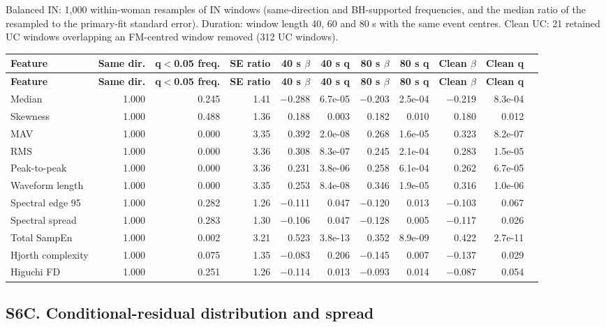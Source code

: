 \documentclass[10pt]{article}
\begin{document}
Balanced IN: 1,000 within-woman resamples of IN windows (same-direction and BH-supported frequencies, and the median ratio of the resampled to the primary-fit standard error). Duration: window length 40, 60 and 80 s with the same event centres. Clean UC: 21 retained UC windows overlapping an FM-centred window removed (312 UC windows).
\begin{longtable}{p{3.0cm}rrrrrrrrrr}
\toprule
\textbf{Feature} & \textbf{Same dir.} & \textbf{q$<$0.05 freq.} & \textbf{SE ratio} & \textbf{40 s $\beta$} & \textbf{40 s q} & \textbf{80 s $\beta$} & \textbf{80 s q} & \textbf{Clean $\beta$} & \textbf{Clean q} \\
\midrule
\endfirsthead
\toprule
\textbf{Feature} & \textbf{Same dir.} & \textbf{q$<$0.05 freq.} & \textbf{SE ratio} & \textbf{40 s $\beta$} & \textbf{40 s q} & \textbf{80 s $\beta$} & \textbf{80 s q} & \textbf{Clean $\beta$} & \textbf{Clean q} \\
\midrule
\endhead
Median & 1.000 & 0.245 & 1.41 & $-$0.288 & 6.7e-05 & $-$0.203 & 2.5e-04 & $-$0.219 & 8.3e-04 \\
Skewness & 1.000 & 0.488 & 1.36 & 0.188 & 0.003 & 0.182 & 0.010 & 0.180 & 0.012 \\
MAV & 1.000 & 0.000 & 3.35 & 0.392 & 2.0e-08 & 0.268 & 1.6e-05 & 0.323 & 8.2e-07 \\
RMS & 1.000 & 0.000 & 3.36 & 0.308 & 8.3e-07 & 0.245 & 2.1e-04 & 0.283 & 1.5e-05 \\
Peak-to-peak & 1.000 & 0.000 & 3.36 & 0.231 & 3.8e-06 & 0.258 & 6.1e-04 & 0.262 & 6.7e-05 \\
Waveform length & 1.000 & 0.000 & 3.35 & 0.253 & 8.4e-08 & 0.346 & 1.9e-05 & 0.316 & 1.0e-06 \\
Spectral edge 95 & 1.000 & 0.282 & 1.26 & $-$0.111 & 0.047 & $-$0.120 & 0.013 & $-$0.103 & 0.067 \\
Spectral spread & 1.000 & 0.283 & 1.30 & $-$0.106 & 0.047 & $-$0.128 & 0.005 & $-$0.117 & 0.026 \\
Total SampEn & 1.000 & 0.002 & 3.21 & 0.523 & 3.8e-13 & 0.352 & 8.9e-09 & 0.422 & 2.7e-11 \\
Hjorth complexity & 1.000 & 0.075 & 1.35 & $-$0.083 & 0.206 & $-$0.145 & 0.007 & $-$0.137 & 0.029 \\
Higuchi FD & 1.000 & 0.251 & 1.26 & $-$0.114 & 0.013 & $-$0.093 & 0.014 & $-$0.087 & 0.054 \\
\bottomrule
\end{longtable}
\subsection*{S6C. Conditional-residual distribution and spread}
\end{document}
